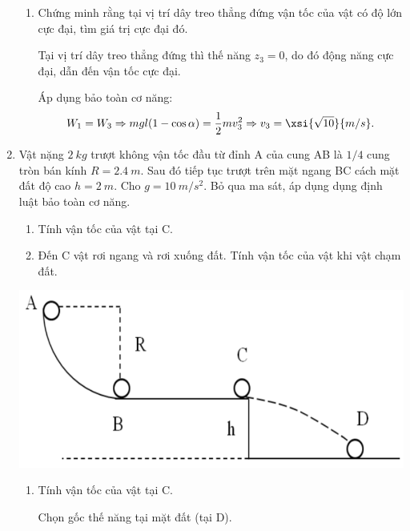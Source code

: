 \begin{enumerate}[label=\bfseries Câu \arabic*:]
{\begin{enumerate}[label=\alph*)]
			Chọn gốc thế năng tại vị trí cân bằng của vật. Áp dụng định luật bảo toàn cơ năng:
			$$W_1 = W_2 \Rightarrow mgl(1-\cos \alpha) + 0 = \dfrac{1}{2} mv_2^2 + mgl (1-\cos \beta) \Rightarrow v_2 = \SI{2.7}{m/s}.$$
			
			\item Chứng minh rằng tại vị trí dây treo thẳng đứng vận tốc của vật có độ lớn cực đại, tìm giá trị cực đại đó.
			
			Tại vị trí dây treo thẳng đứng thì thế năng $z_3=0$, do đó động năng cực đại, dẫn đến vận tốc cực đại.
			
			Áp dụng bảo toàn cơ năng:
			$$W_1 = W_3 \Rightarrow mgl(1-\cos \alpha) = \dfrac{1}{2}mv_3^2 \Rightarrow v_3 = \xsi{\sqrt{10}}{m/s}.$$
		\end{enumerate}
	}
	\item {}
	
	
	{
		Vật nặng $\SI{2}{kg}$ trượt không vận tốc đầu từ đỉnh A của cung AB là $1/4$ cung tròn bán kính $R=\SI{2.4}{m}$. Sau đó tiếp tục trượt trên mặt ngang BC cách mặt đất độ cao $h=\SI{2}{m}$. Cho $g=\SI{10}{m/s^2}$. Bỏ qua ma sát, áp dụng dụng định luật bảo toàn cơ năng.
		\begin{enumerate}[label=\alph*)]
			\item Tính vận tốc của vật tại C.
			\item Đến C vật rơi ngang và rơi xuống đất. Tính vận tốc của vật khi vật chạm đất.
		\end{enumerate}
		\begin{center}
			\includegraphics[scale=0.4]{../figs/VN10-2022-PH-TP029-4}
		\end{center}
	}
	
	\hideall
	{	
			\begin{enumerate}[label=\alph*)]
			\item Tính vận tốc của vật tại C.
			
			Chọn gốc thế năng tại mặt đất (tại D).
			

\end{enumerate}}
\end{enumerate}
